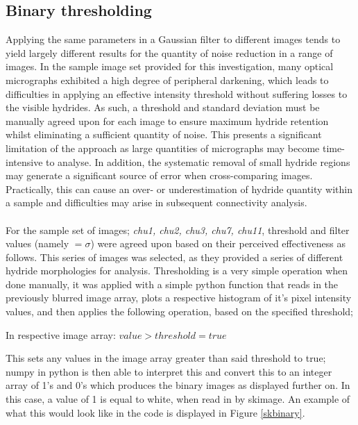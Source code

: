 \documentclass{article}
\begin{document}
	\subsection{Binary thresholding}
	Applying the same parameters in a Gaussian filter to different images tends to yield largely different results for the quantity of noise reduction in a range of images. In the sample image set provided for this investigation, many optical micrographs exhibited a high degree of peripheral darkening, which leads to difficulties in applying an effective intensity threshold without suffering losses to the visible hydrides. As such, a threshold and standard deviation must be manually agreed upon for each image to ensure maximum hydride retention whilst eliminating a sufficient quantity of noise. This presents a significant limitation of the approach as large quantities of micrographs may become time-intensive to analyse. In addition, the systematic removal of small hydride regions may generate a significant source of error when cross-comparing images. Practically, this can cause an over- or underestimation of hydride quantity within a sample and difficulties may arise in subsequent connectivity analysis.
	\\ 
	\\
	For the sample set of images; \textit{chu1, chu2, chu3, chu7, chu11}, threshold and filter values (namely $=\sigma$) were agreed upon based on their perceived effectiveness as follows. This series of images was selected, as they provided a series of different hydride morphologies for analysis. Thresholding is a very simple operation when done manually, it was applied with a simple python function that reads in the previously blurred image array, plots a respective histogram of it's pixel intensity values, and then applies the following operation, based on the specified threshold;
	\begin{center}
		In respective image array: $ value > threshold = true $
	\end{center}
	This sets any values in the image array greater than said threshold to true; numpy in python is then able to interpret this and convert this to an integer array of 1's and 0's which produces the binary images as displayed further on. In this case, a value of 1 is equal to white, when read in by skimage. An example of what this would look like in the code is displayed in Figure \ref{skbinary}.
	
\end{document}
